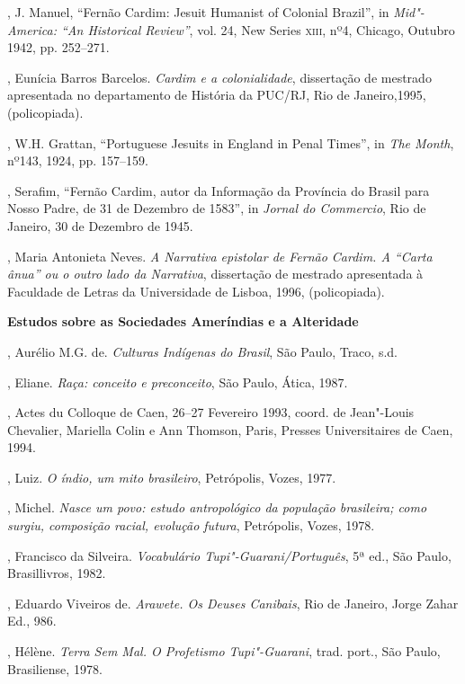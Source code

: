 \begin{bibliohedra}
, J. Manuel, ``Fernão Cardim: Jesuit Humanist of Colonial
Brazil'', in \textit{Mid"-America: ``An Historical Review''}, vol. 24, New
Series \textsc{xiii}, nº4, Chicago, Outubro 1942, pp. 252--271.

, Eunícia Barros Barcelos. \textit{Cardim e a colonialidade}, 
dissertação de mestrado apresentada no departamento de História da
PUC/RJ, Rio de Janeiro,1995, (policopiada).

, W.H. Grattan, ``Portuguese Jesuits in England in Penal Times'',
in \textit{The Month}, nº143, 1924, pp. 157--159.

, Serafim, ``Fernão Cardim, autor da Informação da Província do
Brasil para Nosso Padre, de 31 de Dezembro de 1583'', in \textit{Jornal
do Commercio}, Rio de Janeiro, 30 de Dezembro de 1945.

, Maria Antonieta Neves. \textit{A Narrativa epistolar de Fernão
Cardim. A ``Carta ânua'' ou o outro lado da Narrativa}, dissertação de
mestrado apresentada à Faculdade de Letras da Universidade de Lisboa,
1996, (policopiada).

\vspace*{2ex}
\scriptsize\textbf{Estudos sobre as Sociedades Ameríndias e a Alteridade}

, Aurélio M.G. de. \textit{Culturas Indígenas do Brasil}, São Paulo, Traco, s.d.

, Eliane. \textit{Raça: conceito e preconceito}, São Paulo, Ática, 1987.

, Actes du Colloque de Caen, 26--27 Fevereiro 1993, coord.
de Jean"-Louis Chevalier, Mariella Colin e Ann Thomson, Paris, Presses
Universitaires de Caen, 1994.

, Luiz. \textit{O índio, um mito brasileiro}, Petrópolis, Vozes, 1977.

, Michel. \textit{Nasce um povo: estudo antropológico da
população brasileira; como surgiu, composição racial, evolução futura}, 
Petrópolis, Vozes, 1978.

, Francisco da Silveira. \textit{Vocabulário
Tupi"-Guarani/Português}, 5ª ed., São Paulo, Brasillivros, 1982.

, Eduardo Viveiros de. \textit{Arawete. Os Deuses Canibais}, Rio
de Janeiro, Jorge Zahar Ed., 986.

, Hélène. \textit{Terra Sem Mal. O Profetismo Tupi"-Guarani}, 
trad. port., São Paulo, Brasiliense, 1978.


\end{bibliohedra}
